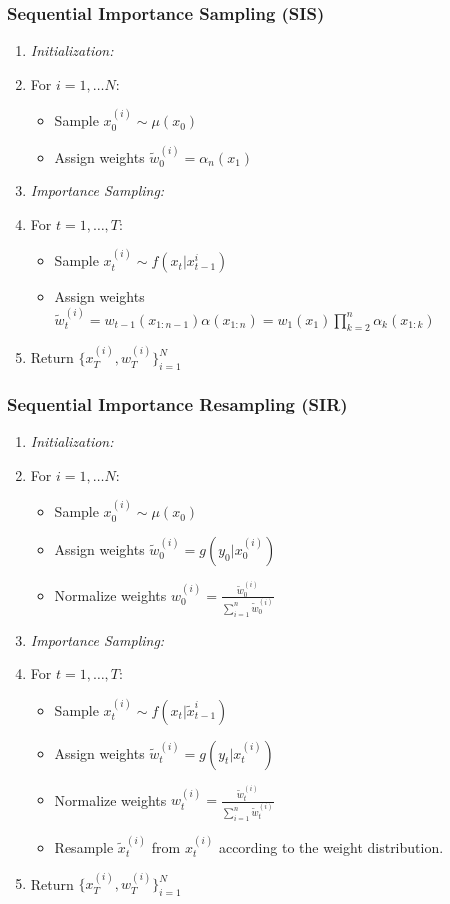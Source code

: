 \documentclass{beamer}
\begin{document}
\begin{frame}
\frametitle{Sequential Importance Sampling (SIS)}
\begin{enumerate}
\item \textit{Initialization:}
\item[] For $i=1,\dots N$:
\begin{itemize}
\item[] Sample $x_0^{(i)} \sim \mu(x_0)$ 
\item[] Assign weights $\widetilde{w}_0^{(i)} = \alpha_n(x_1)$
\end{itemize}
\item \textit{Importance Sampling:}
\item[] For $t=1,\dots,T$:
\begin{itemize}
\item[] Sample $x_t^{(i)} \sim f(x_t|x_{t-1}^{i})$
\item[] Assign weights $\widetilde{w}_t^{(i)} = w_{t-1}(x_{1:n-1})\alpha(x_{1:n})=w_1(x_1)\prod_{k=2}^{n}\alpha_k(x_{1:k})$
\end{itemize}
\item Return $\{x_T^{(i)},w_T^{(i)}\}_{i=1}^N$
\end{enumerate}
\end{frame}

\begin{frame}
\frametitle{Sequential Importance Resampling (SIR)}
\begin{enumerate}
\item \textit{Initialization:}
\item[] For $i=1,\dots N$:
\begin{itemize}
\item[] Sample $x_0^{(i)} \sim \mu(x_0)$ 
\item[] Assign weights $\widetilde{w}_0^{(i)} = g(y_0|x_0^{(i)})$
\item[] Normalize weights $w_0^{(i)} = \frac{\widetilde{w}_0^{(i)}}{\sum_{i=1}^{n} \widetilde{w}_0^{(i)}}$
\end{itemize}
\item \textit{Importance Sampling:}
\item[] For $t=1,\dots,T$:
\begin{itemize}
\item[] Sample $x_t^{(i)} \sim f(x_t|\widetilde{x}_{t-1}^{i})$
\item[] Assign weights $\widetilde{w}_t^{(i)} = g(y_t|x_t^{(i)})$
\item[] Normalize weights $w_t^{(i)} = \frac{\widetilde{w}_t^{(i)}}{\sum_{i=1}^{n} \widetilde{w}_t^{(i)}}$
\item[] Resample $\widetilde{x}_t^{(i)}$ from $x_t^{(i)}$ according to the weight distribution.
\end{itemize}
\item Return $\{x_T^{(i)},w_T^{(i)}\}_{i=1}^N$
\end{enumerate}
\end{frame}
\end{document}
